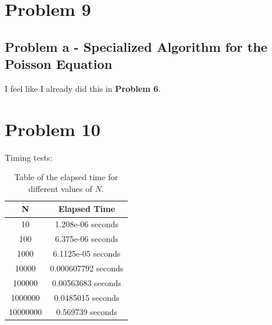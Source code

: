 \documentclass[english,notitlepage]{revtex4-1}  %
\begin{document}
\section*{Problem 9}
\subsection*{Problem a - Specialized Algorithm for the Poisson Equation}
I feel like I already did this in \textbf{Problem 6}.

\section*{Problem 10}

Timing tests:

\begin{table}
    \centering
    \begin{tabular}{|c|c|}
        \hline
        \textbf{N} & \textbf{Elapsed Time} \\
        \hline
        10          & 1.208e-06 seconds      \\
        100         & 6.375e-06 seconds      \\
        1000        & 6.1125e-05 seconds     \\
        10000       & 0.000607792 seconds    \\
        100000      & 0.00563683 seconds     \\
        1000000     & 0.0485015 seconds      \\
        10000000    & 0.569739 seconds       \\
        \hline
    \end{tabular}
    \caption{Table of the elapsed time for different values of \( N \).}
    \label{tab:elapsed_time}
\end{table}
\end{document}

